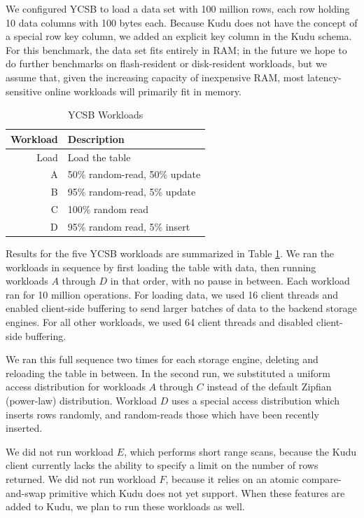 \documentclass{vldb}
\begin{document}
We configured YCSB to load a data set with 100 million rows, each row holding 10 data columns with 100
bytes each. Because Kudu does not have the concept of a special row key column, we added an explicit
key column in the Kudu schema. For this benchmark, the data set fits entirely in RAM; in the
future we hope to do further benchmarks on flash-resident or disk-resident workloads, but
we assume that, given the increasing capacity of inexpensive RAM, most latency-sensitive
online workloads will primarily fit in memory.

\begin{table}
  \begin{tabular}{r|l}
    Workload & Description\\\hline
    Load     & Load the table\\
    A        & 50\% random-read, 50\% update\\
    B        & 95\% random-read, 5\% update\\
    C        & 100\% random read\\
    D        & 95\% random read, 5\% insert
  \end{tabular}
  \caption{YCSB Workloads}
  \label{tab:ycsb_workloads}
\end{table}

Results for the five YCSB workloads are summarized in Table
\ref{tab:ycsb_workloads}. We ran the workloads in sequence by first loading the table
with data, then running workloads $A$ through $D$ in that order, with no pause in between.
Each workload ran for 10 million operations. For loading data, we used 16 client threads and enabled
client-side buffering to send larger batches of data to the backend storage engines. For all other
workloads, we used 64 client threads and disabled client-side buffering.

We ran this full sequence two times for each storage engine, deleting and reloading the
table in between. In the second run, we substituted a uniform access distribution for
workloads $A$ through $C$ instead of the default Zipfian (power-law) distribution.
Workload $D$ uses a special access distribution which inserts rows randomly, and random-reads
those which have been recently inserted.

We did not run workload $E$, which performs short range scans, because the Kudu client
currently lacks the ability to specify a limit on the number of rows returned. We did not
run workload $F$, because it relies on an atomic compare-and-swap primitive which Kudu does
not yet support. When these features are added to Kudu, we plan to run these workloads
as well.
\end{document}
